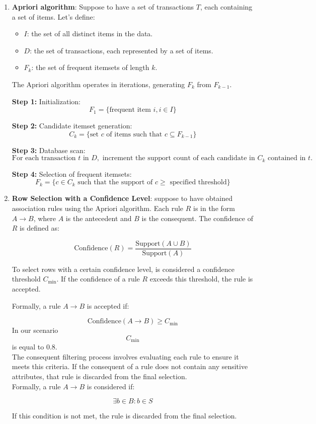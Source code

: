 \documentclass[12pt,a4paper,openright,twoside]{book}
\begin{document}
\begin{enumerate}
    \item \textbf{Apriori algorithm}: Suppose to have a set of transactions $T$, each containing a set of items. Let's define:

\begin{itemize}
  \item $I$: the set of all distinct items in the data.
  \item $D$: the set of transactions, each represented by a set of items.
  \item $F_k$: the set of frequent itemsets of length $k$.
\end{itemize}

The Apriori algorithm operates in iterations, generating $F_k$ from $F_{k-1}$.

\textbf{Step 1:} Initialization:
$$F_1 = \{ \text{frequent item } i, i \in I \}$$

\textbf{Step 2:} Candidate itemset generation:
$$C_k = \{ \text{set } c \text{ of items such that } c \subseteq F_{k-1} \}$$

\textbf{Step 3:} Database scan:
$$\text{For each transaction } t \text{ in } D, \text{ increment the support count of each candidate in } C_k \text{ contained in } t.$$

\textbf{Step 4:} Selection of frequent itemsets:
$$F_k = \{ c \in C_k \text{ such that the support of } c \geq \text{ specified threshold} \}$$

\item \textbf{Row Selection with a Confidence Level}: 
suppose to have obtained association rules using the Apriori algorithm. Each rule $R$ is in the form $A \rightarrow B$, where $A$ is the antecedent and $B$ is the consequent. The confidence of $R$ is defined as:

\[
\text{Confidence}(R) = \frac{\text{Support}(A \cup B)}{\text{Support}(A)}
\]

To select rows with a certain confidence level, is considered a confidence threshold $C_{\text{min}}$. If the confidence of a rule $R$ exceeds this threshold, the rule is accepted.

Formally, a rule $A \rightarrow B$ is accepted if:

\[
\text{Confidence}(A \rightarrow B) \geq C_{\text{min}}
\]
In our scenario
\[
C_{\text{min}}
\]
is equal to 0.8. \\

The consequent filtering process involves evaluating each rule to ensure it meets this criteria. If the consequent of a rule does not contain any sensitive attributes, that rule is discarded from the final selection. \\

Formally, a rule $A \rightarrow B$ is considered if:

\[
\exists b \in B : b \in S
\]

If this condition is not met, the rule is discarded from the final selection.
\end{enumerate}
\end{document}
